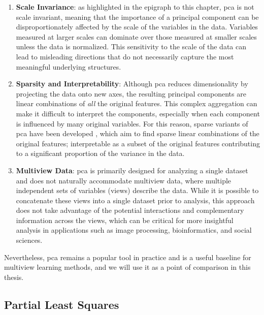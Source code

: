 \begin{enumerate}
    \item \textbf{Scale Invariance}: as highlighted in the epigraph to this chapter, \acrshort{pca} is not scale invariant, meaning that the importance of a principal component can be disproportionately affected by the scale of the variables in the data. Variables measured at larger scales can dominate over those measured at smaller scales unless the data is normalized. This sensitivity to the scale of the data can lead to misleading directions that do not necessarily capture the most meaningful underlying structures.

    \item \textbf{Sparsity and Interpretability}: Although \acrshort{pca} reduces dimensionality by projecting the data onto new axes, the resulting principal components are linear combinations of \textit{all} the original features. This complex aggregation can make it difficult to interpret the components, especially when each component is influenced by many original variables. For this reason, sparse variants of \acrshort{pca} have been developed \citep{zou2006sparse,zou2018selective}, which aim to find sparse linear combinations of the original features; interpretable as a subset of the original features contributing to a significant proportion of the variance in the data.

    \item \textbf{Multiview Data}: \acrshort{pca} is primarily designed for analyzing a single dataset and does not naturally accommodate multiview data, where multiple independent sets of variables (views) describe the data. While it is possible to concatenate these \gls{views} into a single dataset prior to analysis, this approach does not take advantage of the potential interactions and complementary information across the views, which can be critical for more insightful analysis in applications such as image processing, bioinformatics, and social sciences.
\end{enumerate}

Nevertheless, \acrshort{pca} remains a popular tool in practice \citep{greenacre2022principal} and is a useful baseline for multiview learning methods, and we will use it as a point of comparison in this thesis.

\subsection{Partial Least Squares}

